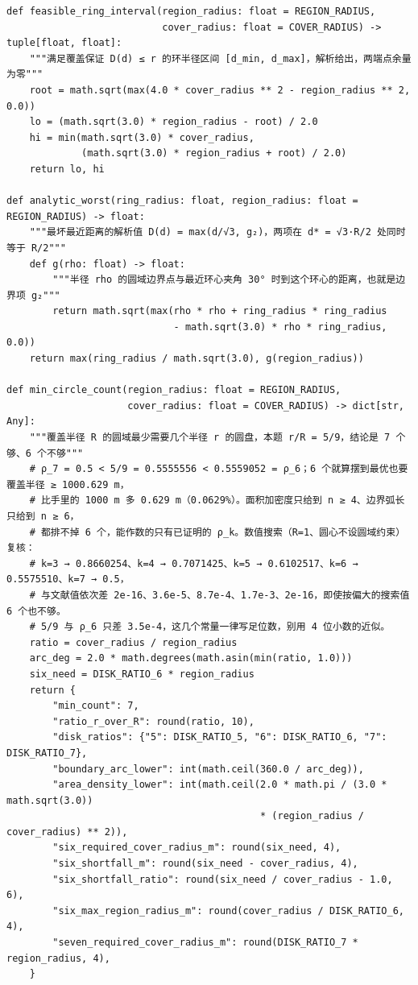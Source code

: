 \documentclass[UTF8, zihao=5,AutoFakeBold=2]{ctexart}
\begin{document}
\begin{lstlisting}
def feasible_ring_interval(region_radius: float = REGION_RADIUS,
                           cover_radius: float = COVER_RADIUS) -> tuple[float, float]:
    """满足覆盖保证 D(d) ≤ r 的环半径区间 [d_min, d_max]，解析给出，两端点余量为零"""
    root = math.sqrt(max(4.0 * cover_radius ** 2 - region_radius ** 2, 0.0))
    lo = (math.sqrt(3.0) * region_radius - root) / 2.0
    hi = min(math.sqrt(3.0) * cover_radius,
             (math.sqrt(3.0) * region_radius + root) / 2.0)
    return lo, hi

def analytic_worst(ring_radius: float, region_radius: float = REGION_RADIUS) -> float:
    """最坏最近距离的解析值 D(d) = max(d/√3, g₂)，两项在 d* = √3·R/2 处同时等于 R/2"""
    def g(rho: float) -> float:
        """半径 rho 的圆域边界点与最近环心夹角 30° 时到这个环心的距离，也就是边界项 g₂"""
        return math.sqrt(max(rho * rho + ring_radius * ring_radius
                             - math.sqrt(3.0) * rho * ring_radius, 0.0))
    return max(ring_radius / math.sqrt(3.0), g(region_radius))

def min_circle_count(region_radius: float = REGION_RADIUS,
                     cover_radius: float = COVER_RADIUS) -> dict[str, Any]:
    """覆盖半径 R 的圆域最少需要几个半径 r 的圆盘，本题 r/R = 5/9，结论是 7 个够、6 个不够"""
    # ρ_7 = 0.5 < 5/9 = 0.5555556 < 0.5559052 = ρ_6；6 个就算摆到最优也要覆盖半径 ≥ 1000.629 m，
    # 比手里的 1000 m 多 0.629 m（0.0629%）。面积加密度只给到 n ≥ 4、边界弧长只给到 n ≥ 6，
    # 都排不掉 6 个，能作数的只有已证明的 ρ_k。数值搜索（R=1、圆心不设圆域约束）复核：
    # k=3 → 0.8660254、k=4 → 0.7071425、k=5 → 0.6102517、k=6 → 0.5575510、k=7 → 0.5，
    # 与文献值依次差 2e-16、3.6e-5、8.7e-4、1.7e-3、2e-16，即使按偏大的搜索值 6 个也不够。
    # 5/9 与 ρ_6 只差 3.5e-4，这几个常量一律写足位数，别用 4 位小数的近似。
    ratio = cover_radius / region_radius
    arc_deg = 2.0 * math.degrees(math.asin(min(ratio, 1.0)))
    six_need = DISK_RATIO_6 * region_radius
    return {
        "min_count": 7,
        "ratio_r_over_R": round(ratio, 10),
        "disk_ratios": {"5": DISK_RATIO_5, "6": DISK_RATIO_6, "7": DISK_RATIO_7},
        "boundary_arc_lower": int(math.ceil(360.0 / arc_deg)),
        "area_density_lower": int(math.ceil(2.0 * math.pi / (3.0 * math.sqrt(3.0))
                                            * (region_radius / cover_radius) ** 2)),
        "six_required_cover_radius_m": round(six_need, 4),
        "six_shortfall_m": round(six_need - cover_radius, 4),
        "six_shortfall_ratio": round(six_need / cover_radius - 1.0, 6),
        "six_max_region_radius_m": round(cover_radius / DISK_RATIO_6, 4),
        "seven_required_cover_radius_m": round(DISK_RATIO_7 * region_radius, 4),
    }


\end{lstlisting}
\end{document}
